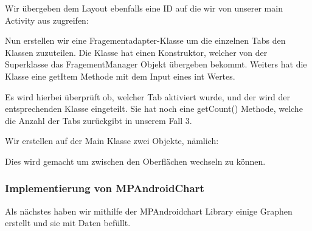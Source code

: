 

Wir übergeben dem Layout ebenfalls eine ID auf die wir von unserer main Activity aus zugreifen: 




Nun erstellen wir eine Fragementadapter-Klasse um die einzelnen Tabs den Klassen zuzuteilen. 
Die Klasse hat einen Konstruktor, welcher von der Superklasse das FragementManager Objekt übergeben bekommt.
Weiters hat die Klasse eine getItem Methode mit dem Input eines int Wertes. 



Es wird hierbei überprüft ob, welcher Tab aktiviert wurde, und der wird der entsprechenden Klasse eingeteilt. 
Sie hat noch eine getCount() Methode, welche die Anzahl der Tabs zurückgibt in unserem Fall 3.


Wir erstellen auf der Main Klasse zwei Objekte, nämlich:


Dies wird gemacht um zwischen den Oberflächen wechseln zu können.

 

\subsubsection*{Implementierung von MPAndroidChart}
Als nächstes haben wir mithilfe der MPAndroidchart Library einige Graphen erstellt und sie mit Daten befüllt.



\clearpage %